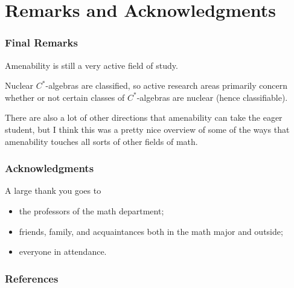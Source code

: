 \documentclass{beamer-custom}
\begin{document}
\section{Remarks and Acknowledgments}%
\begin{frame}
  \frametitle{Final Remarks}
  Amenability is still a very active field of study.\pause\newline

  Nuclear $C^{\ast}$-algebras are classified, so active research areas primarily concern whether or not certain classes of $C^{\ast}$-algebras are nuclear (hence classifiable).\pause\newline

  There are also a lot of other directions that amenability can take the eager student, but I think this was a pretty nice overview of some of the ways that amenability touches all sorts of other fields of math.
\end{frame}
\begin{frame}
  \frametitle{Acknowledgments}
  A large thank you goes to
  \begin{itemize}
    \item the professors of the math department;
    \item friends, family, and acquaintances both in the math major and outside;
    \item everyone in attendance.
  \end{itemize}
\end{frame}
\begin{frame}[allowframebreaks]
  \frametitle{References}
  \nocite{*}
  {\tiny \printbibliography}
\end{frame}
\end{document}
